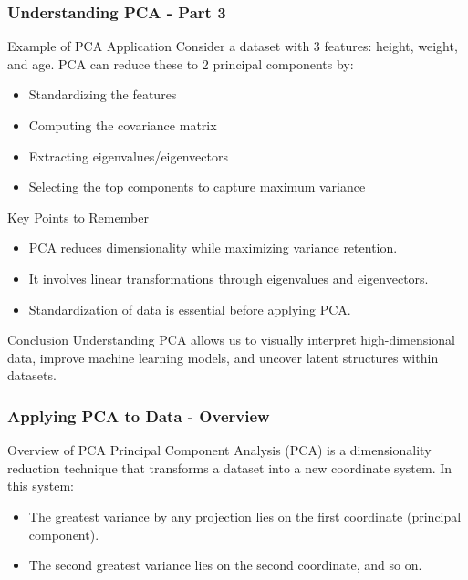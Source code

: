 \documentclass[aspectratio=169]{beamer}
\begin{document}
\begin{frame}[fragile]
    \frametitle{Understanding PCA - Part 3}
    \begin{block}{Example of PCA Application}
        Consider a dataset with 3 features: height, weight, and age. PCA can reduce these to 2 principal components by:
        \begin{itemize}
            \item Standardizing the features
            \item Computing the covariance matrix
            \item Extracting eigenvalues/eigenvectors
            \item Selecting the top components to capture maximum variance
        \end{itemize}
    \end{block}

    \begin{block}{Key Points to Remember}
        \begin{itemize}
            \item PCA reduces dimensionality while maximizing variance retention.
            \item It involves linear transformations through eigenvalues and eigenvectors.
            \item Standardization of data is essential before applying PCA.
        \end{itemize}
    \end{block}

    \begin{block}{Conclusion}
        Understanding PCA allows us to visually interpret high-dimensional data, improve machine learning models, and uncover latent structures within datasets.
    \end{block}
\end{frame}

\begin{frame}[fragile]
    \frametitle{Applying PCA to Data - Overview}
    \begin{block}{Overview of PCA}
        Principal Component Analysis (PCA) is a dimensionality reduction technique that transforms a dataset into a new coordinate system. 
        In this system:
        \begin{itemize}
            \item The greatest variance by any projection lies on the first coordinate (principal component).
            \item The second greatest variance lies on the second coordinate, and so on.
        \end{itemize}
    \end{block}
\end{frame}
\end{document}

